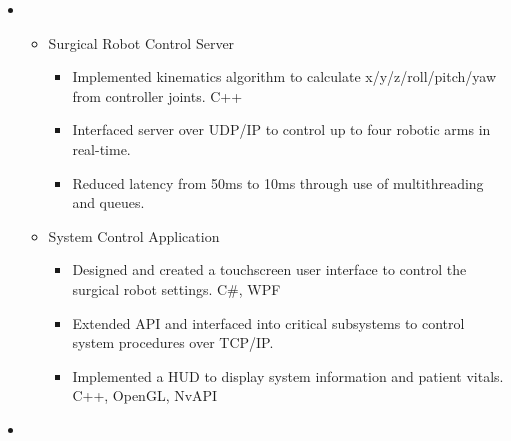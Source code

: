 \documentclass[letterpaper,11pt]{article}
\begin{document}
\begin{itemize}
  \item[]
    \begin{itemize}
      \item{Surgical Robot Control Server}
      \begin{itemize}
        \item{Implemented kinematics algorithm to calculate x/y/z/roll/pitch/yaw from controller joints. C++}
        \item{Interfaced server over UDP/IP to control up to four robotic arms in real-time.}
        \item{Reduced latency from 50ms to 10ms through use of multithreading and queues.}
      \end{itemize}
      \item{System Control Application}
      \begin{itemize}
        \item{Designed and created a touchscreen user interface to control the surgical robot settings. C\#, WPF}
        \item{Extended API and interfaced into critical subsystems to control system procedures over TCP/IP.}
        \item{Implemented a HUD to display system information and patient vitals. C++, OpenGL, NvAPI}
      \end{itemize}
    \end{itemize}
\end{itemize}

\begin{itemize}
  \item[]
\end{itemize}
\end{document}
